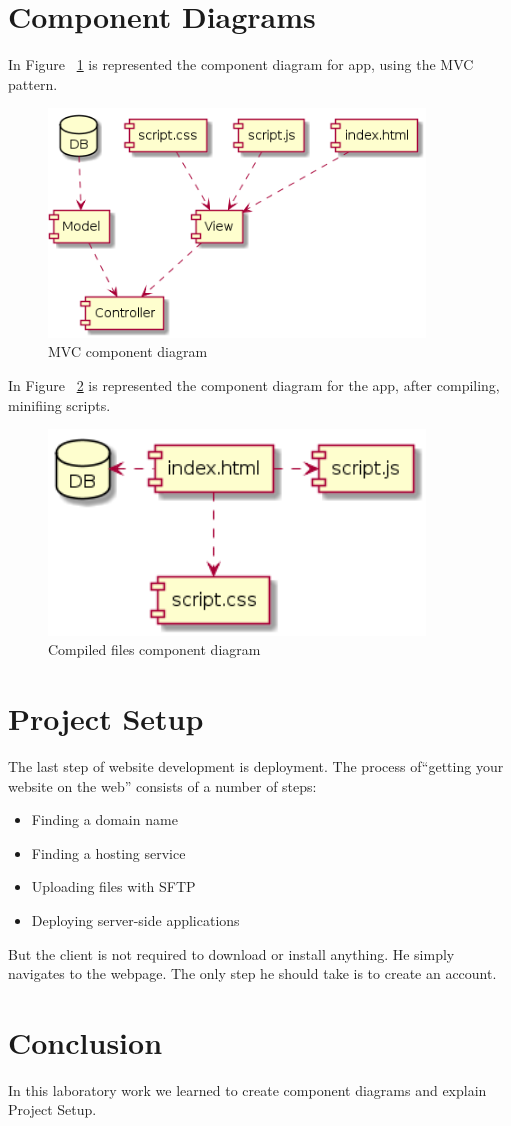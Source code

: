 \documentclass[12pt,a4paper,titlepage]{article}
\begin{document}
\section{Component Diagrams}
In Figure ~\ref{fig:intermediar} is represented the component diagram for app, using the MVC pattern.
\begin{figure}[H]
\centering
	\includegraphics[width=10cm]{intermediar}
	\caption{MVC component diagram}
	\label{fig:intermediar}
\end{figure}

In Figure ~\ref{fig:final} is represented the component diagram for the app, after compiling, minifiing scripts.
\begin{figure}[H]
\centering
	\includegraphics[width=10cm]{final}
	\caption{Compiled files component diagram}
	\label{fig:final}
\end{figure}

\section{Project Setup}
The last step of website development is deployment. The process of“getting your website on the web” consists of a number of steps:

\begin{itemize}
	\item
	Finding a domain name
\item
	Finding a hosting service
\item
	Uploading files with SFTP
	\item 
	Deploying server-side applications
\end{itemize}

But the client is not required to download or install anything. He simply navigates to the webpage. The only step he should take is to create an account.

\section{Conclusion}
In this laboratory work we learned to create component diagrams and explain Project Setup.

\clearpage
\cleardoublepage
\end{document}
